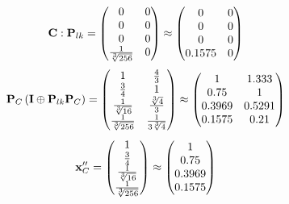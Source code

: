 \documentclass[10pt,a4paper]{article}
\begin{document}
	\[
		\bold{C}: \bold{P}_{lk} = 
		\begin{pmatrix}
			{{0}} {} & {{0}} {} \\
			{{0}} {} & {{0}} {} \\
			{{0}} {} & {{0}} {} \\
			\frac{1} {\sqrt[3]{256}} & {{0}} {} \\
		\end{pmatrix}
		\approx
		\begin{pmatrix}
			0        & 0        \\
			0        & 0        \\
			0        & 0        \\
			0.1575   & 0        \\
		\end{pmatrix}
	\]
	\[
		\bold{P}_{C}\left(\bold{I} \oplus \bold{P}_{lk}\bold{P}_{C}\right) = 
		\begin{pmatrix}
			{1} {} & \frac{{4}} {{3}} \\
			\frac{{3}} {{4}} & {1} {} \\
			\frac{1} {\sqrt[3]{16}} & \frac{\sqrt[3]{4}} {{3}} \\
			\frac{1} {\sqrt[3]{256}} & \frac{1} {{3}\sqrt[3]{4}} \\
		\end{pmatrix}
		\approx
		\begin{pmatrix}
			1        & 1.333    \\
			0.75     & 1        \\
			0.3969   & 0.5291   \\
			0.1575   & 0.21     \\
		\end{pmatrix}
	\]
	\[
		\bold{x}''_{C} = 
		\begin{pmatrix}
			{1} {} \\
			\frac{{3}} {{4}} \\
			\frac{1} {\sqrt[3]{16}} \\
			\frac{1} {\sqrt[3]{256}} \\
		\end{pmatrix}
		\approx
		\begin{pmatrix}
			1        \\
			0.75     \\
			0.3969   \\
			0.1575   \\
		\end{pmatrix}
	\]
\end{document}

